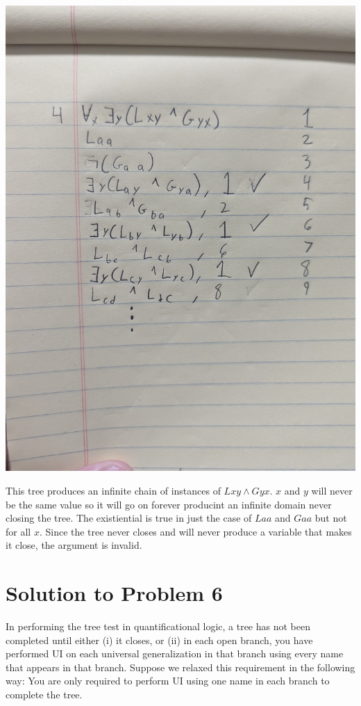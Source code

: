 \documentclass[12pt]{article}
\begin{document}
\includegraphics[width=\textwidth]{4}

This tree produces an infinite chain of instances of $Lxy \land Gyx$. $x$ and $y$ will never be the same value so it will go on forever producint an infinite domain never closing the tree. The existiential is true in just the case of $Laa$ and $Gaa$ but not for all $x$. Since the tree never closes and will never produce a variable that makes it close, the argument is invalid. 

\section*{Solution to Problem 6}

 In performing the tree test in quantificational logic, a tree has not been completed until either 
 (i) it closes, or 
 (ii) in each open branch, you have performed UI on each universal generalization in that 
branch using every name that appears in that branch. Suppose we relaxed this requirement in the following way: You are only required to perform UI using one name in each branch to complete the tree. 
\end{document}
